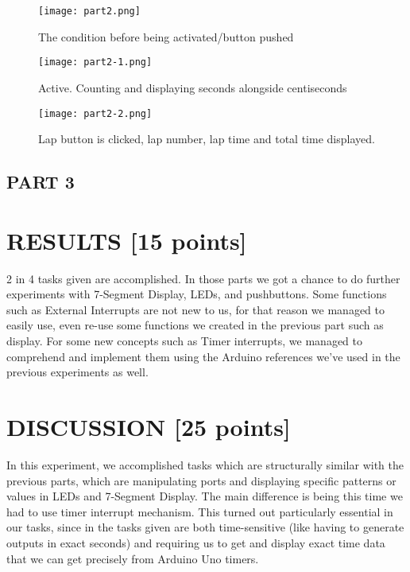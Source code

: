 \documentclass[pdftex,12pt,a4paper]{article}
\begin{document}
\begin{figure}[H]
	\centering
	\texttt{[image: part2.png]}	
	\caption{The condition before being activated/button pushed}
	\label{fig5}
\end{figure}

\begin{figure}[H]
	\centering
	\texttt{[image: part2-1.png]}	
	\caption{Active. Counting and displaying seconds alongside centiseconds}
	\label{fig5}
\end{figure}

\begin{figure}[H]
	\centering
	\texttt{[image: part2-2.png]}	
	\caption{Lap button is clicked, lap number, lap time and total time displayed.}
	\label{fig5}
\end{figure}

\subsection{PART 3}


\section{RESULTS [15 points]}
2 in 4 tasks given are accomplished. In those parts we got a chance to do further experiments with 7-Segment Display, LEDs, and pushbuttons. Some functions such as External Interrupts are not new to us, for that reason we managed to easily use, even re-use some functions we created in the previous part such as display. For some new concepts such as Timer interrupts, we managed to comprehend and implement them using the Arduino references we've used in the previous experiments as well. 
\section{DISCUSSION [25 points]}
In this experiment, we accomplished tasks which are structurally similar with the previous parts, which are manipulating ports and displaying specific patterns or values in LEDs and 7-Segment Display. The main difference is being this time we had to use timer interrupt mechanism. This turned out particularly essential in our tasks, since in the tasks given are both time-sensitive (like having to generate outputs in exact seconds) and requiring us to get and display exact time data that we can get precisely from Arduino Uno timers. 
\end{document}
